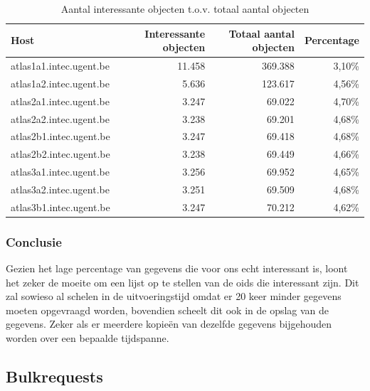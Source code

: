 \begin{table}[h]
\centering
\begin{tabular}{@{}lrrr@{}}
\toprule
Host                    & Interessante objecten & Totaal aantal objecten & Percentage \\ \midrule
atlas1a1.intec.ugent.be & 11.458                & 369.388                & 3,10\%     \\
atlas1a2.intec.ugent.be & 5.636                 & 123.617                & 4,56\%     \\
atlas2a1.intec.ugent.be & 3.247                 & 69.022                 & 4,70\%     \\
atlas2a2.intec.ugent.be & 3.238                 & 69.201                 & 4,68\%     \\
atlas2b1.intec.ugent.be & 3.247                 & 69.418                 & 4,68\%     \\
atlas2b2.intec.ugent.be & 3.238                 & 69.449                 & 4,66\%     \\
atlas3a1.intec.ugent.be & 3.256                 & 69.952                 & 4,65\%     \\
atlas3a2.intec.ugent.be & 3.251                 & 69.509                 & 4,68\%     \\
atlas3b1.intec.ugent.be & 3.247                 & 70.212                 & 4,62\%     \\ \bottomrule
\end{tabular}
\caption{Aantal interessante objecten t.o.v. totaal aantal objecten}
\label{tabel-fracties}
\end{table}

\subsubsection{Conclusie}

Gezien het lage percentage van gegevens die voor ons echt interessant is,
loont het zeker de moeite om een lijst op te stellen van de \glspl{oid} die interessant zijn.
Dit zal sowieso al schelen in de uitvoeringstijd omdat er 20 keer minder gegevens moeten opgevraagd worden,
bovendien scheelt dit ook in de opslag van de gegevens.
Zeker als er meerdere kopieën van dezelfde gegevens bijgehouden worden over een bepaalde tijdspanne.


\subsection{Bulkrequests}
\label{bulkrequests-benchmarks}

